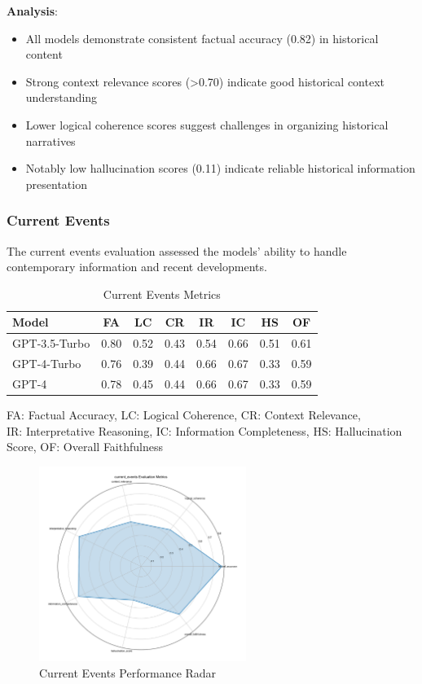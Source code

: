 \textbf{Analysis}:
\begin{itemize}
    \item All models demonstrate consistent factual accuracy (0.82) in historical content
    \item Strong context relevance scores (>0.70) indicate good historical context understanding
    \item Lower logical coherence scores suggest challenges in organizing historical narratives
    \item Notably low hallucination scores (0.11) indicate reliable historical information presentation
\end{itemize}

\subsubsection{Current Events}
The current events evaluation assessed the models' ability to handle contemporary information and recent developments.

\begin{table}[!htbp]
\centering
\setlength{\tabcolsep}{4pt}  %
\begin{tabular}{|l|c|c|c|c|c|c|c|}
\hline
\textbf{Model} & \textbf{FA} & \textbf{LC} & \textbf{CR} & \textbf{IR} 
& \textbf{IC} & \textbf{HS} & \textbf{OF} \\
\hline
GPT-3.5-Turbo & 0.80 & 0.52 & 0.43 & 0.54 & 0.66 & 0.51 & 0.61 \\
GPT-4-Turbo & 0.76 & 0.39 & 0.44 & 0.66 & 0.67 & 0.33 & 0.59 \\
GPT-4 & 0.78 & 0.45 & 0.44 & 0.66 & 0.67 & 0.33 & 0.59 \\
\hline
\end{tabular}
\caption{Current Events Metrics}
\label{tab:results_current_events_metrics}
\begin{flushleft}
\small
FA: Factual Accuracy, LC: Logical Coherence, CR: Context Relevance,\\
IR: Interpretative Reasoning, IC: Information Completeness, HS: Hallucination Score, OF: Overall Faithfulness
\end{flushleft}
\end{table}

\begin{figure}[!htbp]
\centering
\includegraphics[width=0.6\textwidth]{figures/types/current_events_radar_gpt-4.png}
\caption{Current Events Performance Radar}
\label{fig:current_events_radar}
\end{figure}

